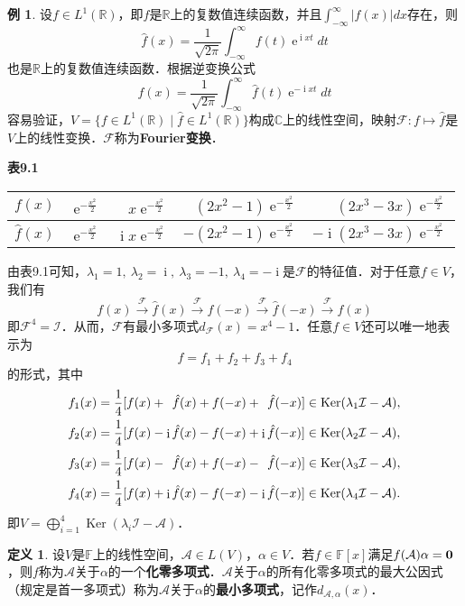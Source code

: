 \documentclass[a4paper,fontset=windows]{ctexbook}
\theoremstyle{definition}
\newtheorem{definition}{定义}[chapter]
\newtheorem{example}{例}[chapter]
\DeclareMathOperator{\E}{e}
\DeclareMathOperator{\I}{i}
\DeclareMathOperator{\Ker}{Ker}
\begin{document}
\begin{example}
设$f\in L^1(\mathbb{R})$，即$f$是$\mathbb{R}$上的复数值连续函数，并且$\int_{-\infty}^{\infty}|f(x)|dx$存在，则
$$\hat{f}(x)=\frac{1}{\sqrt{2\pi}}\int_{-\infty}^{\infty}f(t)\E^{\I xt}dt$$
也是$\mathbb{R}$上的复数值连续函数．根据逆变换公式
$$f(x)=\frac{1}{\sqrt{2\pi}}\int_{-\infty}^{\infty}\hat{f}(t)\E^{-\I xt}dt$$
容易验证，$V=\{f\in L^1(\mathbb{R})\mid\hat{f}\in L^1(\mathbb{R})\}$构成$\mathbb{C}$上的线性空间，映射$\mathcal{F}:f\mapsto\hat{f}$是$V$上的线性变换．$\mathcal{F}$称为{\bf Fourier变换}．
\begin{center}{\bf 表9.1} \\[5pt]
\begin{tabular}{|c|r|r|r|r|}
\hline $f(x)$ & $\E^{-\frac{x^2}{2}}$ & $x\E^{-\frac{x^2}{2}}$ & $(2x^2-1)\E^{-\frac{x^2}{2}}$ & $(2x^3-3x)\E^{-\frac{x^2}{2}}$ \\
\hline $\hat{f}(x)$ & $\E^{-\frac{x^2}{2}}$ & $\I x\E^{-\frac{x^2}{2}}$ & $-(2x^2-1)\E^{-\frac{x^2}{2}}$ & $-\I(2x^3-3x)\E^{-\frac{x^2}{2}}$ \\ \hline
\end{tabular}\end{center}
由表9.1可知，$\lambda_1=1,~\lambda_2=\I,~\lambda_3=-1,~\lambda_4=-\I$是$\mathcal{F}$的特征值．对于任意$f\in V$，我们有
$$f(x)\xrightarrow{\mathcal{F}}\hat{f}(x)\xrightarrow{\mathcal{F}}f(-x)\xrightarrow{\mathcal{F}}\hat{f}(-x)\xrightarrow{\mathcal{F}}f(x)$$
即$\mathcal{F}^4=\mathcal{I}$．从而，$\mathcal{F}$有最小多项式$d_{\mathcal{F}}(x)=x^4-1$．任意$f\in V$还可以唯一地表示为
$$f=f_1+f_2+f_3+f_4$$
的形式，其中
\begin{align*}
f_1(x)&=\frac{1}{4}[f(x)+\hspace{4.5pt}\hat{f}(x)+f(-x)+\hspace{4.5pt}\hat{f}(-x)]\in\Ker(\lambda_1\mathcal{I-A}), \\
f_2(x)&=\frac{1}{4}[f(x)-\I\hat{f}(x)-f(-x)+\I\hat{f}(-x)]\in\Ker(\lambda_2\mathcal{I-A}), \\
f_3(x)&=\frac{1}{4}[f(x)-\hspace{4.5pt}\hat{f}(x)+f(-x)-\hspace{4.5pt}\hat{f}(-x)]\in\Ker(\lambda_3\mathcal{I-A}), \\
f_4(x)&=\frac{1}{4}[f(x)+\I\hat{f}(x)-f(-x)-\I\hat{f}(-x)]\in\Ker(\lambda_4\mathcal{I-A}).
\end{align*}
即$V=\bigoplus\limits_{i=1}^4\Ker(\lambda_i\mathcal{I-A})$．
\end{example}

\begin{definition}\label{def9.14}
设$V$是$\mathbb{F}$上的线性空间，$\mathcal{A}\in L(V)$，$\alpha\in V$．若$f\in\mathbb{F}[x]$满足$f(\mathcal{A})\alpha={\bf 0}$，则$f$称为$\mathcal{A}$关于$\alpha$的一个{\bf 化零多项式}．$\mathcal{A}$关于$\alpha$的所有化零多项式的最大公因式（规定是首一多项式）称为$\mathcal{A}$关于$\alpha$的{\bf 最小多项式}，记作$d_{\mathcal{A},\alpha}(x)$．
\end{definition}
\end{document}
